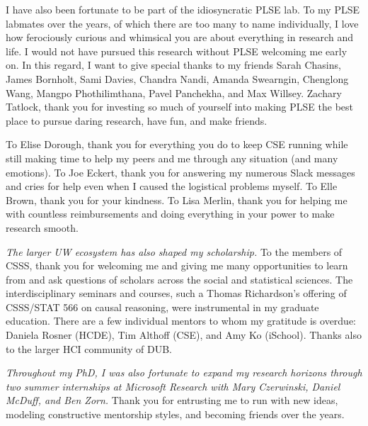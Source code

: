 I have also been fortunate to be part of the idiosyncratic PLSE
lab. 
To my PLSE labmates over the years, of which there are too many to name
individually, I love how ferociously curious and whimsical you are about
everything in research and life. I would not have pursued this
research without PLSE welcoming me early on. In this regard, I want to give
special thanks to my friends Sarah Chasins, James Bornholt, Sami Davies, Chandra
Nandi, Amanda Swearngin, Chenglong Wang, Mangpo Phothilimthana, Pavel Panchekha,
and Max Willsey. Zachary Tatlock, thank you for investing so much of yourself
into making PLSE the best place to pursue daring research, have fun, and make
friends. 

To Elise Dorough, thank you for everything you do to keep CSE running while
still making time to help my peers and me through any situation (and many
emotions). To Joe Eckert, thank you for answering my numerous Slack messages
and cries for help even when I caused the logistical problems myself. To
Elle Brown, thank you for your kindness. To Lisa Merlin, thank you for
helping me with countless reimbursements and doing everything in your power
to make research smooth. 

\textit{The larger UW ecosystem has also shaped my scholarship.} To the members
of CSSS, thank you for welcoming me and giving me many opportunities to learn
from and ask questions of scholars across the social and statistical sciences.
The interdisciplinary seminars and courses, such a Thomas Richardson's offering
of CSSS/STAT 566 on causal reasoning, were instrumental in my graduate
education. There are a few individual mentors to whom my gratitude is overdue:
Daniela Rosner (HCDE), Tim Althoff (CSE), and Amy Ko (iSchool). Thanks also to
the larger HCI community of DUB. 

\textit{Throughout my PhD, I was also fortunate to expand my research horizons
through two summer internships at Microsoft Research with Mary Czerwinski,
Daniel McDuff, and Ben Zorn.} Thank you for entrusting me to run with new ideas,
modeling constructive mentorship styles, and becoming friends over the years.


